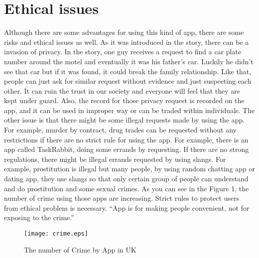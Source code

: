 \documentclass[12pt]{article}
\begin{document}
\section{Ethical issues}
Although there are some advantages for using this kind of app, there are some risks and ethical issues as well. As it was introduced in the story, there can be a invasion of privacy. In the story, one guy receives a request to find a car plate number around the motel and eventually it was his father's car. Luckily he didn't see that car but if it was found, it could break the family relationship. Like that, people can just ask for similar request without evidence and just suspecting each other. It can ruin the trust in our society and everyone will feel that they are kept under guard. Also, the record for those privacy request is recorded on the app, and it can be used in improper way or can be traded within individuals. The other issue is that there might be some illegal requests made by using the app. For example, murder by contract, drug trades can be requested without any restrictions if there are no strict rule for using the app. For example, there is an app called TaskRabbit\cite{taskrabbit}, doing some errands by requesting. If there are no strong regulations, there might be illegal errands requested by using slangs. For example, prostitution is illegal but many people, by using random chatting app or dating app, they use slangs so that only certain group of people can understand and do prostitution and some sexual crimes. As you can see in the Figure 1, the number of crime using those apps are increasing. Strict rules to protect users from ethical problem is necessary. \enquote{App is for making people convenient, not for exposing to the crime.}

\begin{figure}[ht]
 \begin{center}
  \texttt{[image: crime.eps]}
  \caption{\label{mypict} The number of Crime by App in UK \cite{crime}}
 \end{center}
\end{figure}

\newpage


\end{document}

